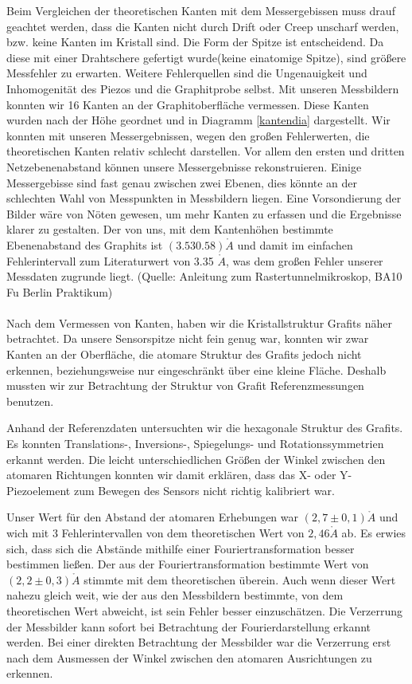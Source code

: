 \documentclass[10pt,a4paper]{article}
\begin{document}
Beim Vergleichen der theoretischen Kanten mit dem Messergebissen muss drauf geachtet werden, dass die Kanten nicht durch Drift oder Creep unscharf werden, bzw. keine Kanten im Kristall sind. Die Form der Spitze ist entscheidend. Da diese mit einer Drahtschere gefertigt wurde(keine einatomige Spitze), sind größere Messfehler zu erwarten. Weitere Fehlerquellen sind die Ungenauigkeit und Inhomogenität des Piezos und die Graphitprobe selbst.
Mit unseren Messbildern konnten wir 16 Kanten an der Graphitoberfläche vermessen. Diese Kanten wurden nach der Höhe geordnet und in Diagramm \ref{kantendia} dargestellt. Wir konnten mit unseren Messergebnissen, wegen den großen Fehlerwerten, die theoretischen Kanten relativ schlecht darstellen. Vor allem den ersten und dritten Netzebenenabstand können unsere Messergebnisse rekonstruieren. Einige Messergebisse sind fast genau zwischen zwei Ebenen, dies könnte an der schlechten Wahl von Messpunkten in Messbildern liegen. Eine Vorsondierung der Bilder wäre von Nöten gewesen, um mehr Kanten zu erfassen und die Ergebnisse klarer zu gestalten.
Der von uns, mit dem Kantenhöhen bestimmte Ebenenabstand des Graphits ist $(3.53 0.58)\mathring{A}$ und damit im einfachen Fehlerintervall zum Literaturwert von 3.35 $\mathring{A}$, was dem großen Fehler unserer Messdaten zugrunde liegt. (Quelle: Anleitung zum Rastertunnelmikroskop, BA10 Fu Berlin Praktikum)
\\\\
Nach dem Vermessen von Kanten, haben wir die Kristallstruktur Grafits näher betrachtet. Da unsere Sensorspitze nicht fein genug war, konnten wir zwar Kanten an der Oberfläche, die atomare Struktur des Grafits jedoch nicht erkennen, beziehungsweise nur eingeschränkt über eine kleine Fläche. Deshalb mussten wir zur Betrachtung der Struktur von Grafit Referenzmessungen benutzen.

Anhand der Referenzdaten untersuchten wir die hexagonale Struktur des Grafits. Es konnten Translations-, Inversions-, Spiegelungs- und Rotationssymmetrien erkannt werden. Die leicht unterschiedlichen Größen der Winkel zwischen den atomaren Richtungen konnten wir damit erklären, dass das X- oder Y-Piezoelement zum Bewegen des Sensors nicht richtig kalibriert war.

Unser Wert für den Abstand der atomaren Erhebungen war $(2,7 \pm 0,1) \mathring{A}$ und wich mit 3 Fehlerintervallen von dem theoretischen Wert von $2,46 \mathring{A}$ ab. Es erwies sich, dass sich die Abstände mithilfe einer Fouriertransformation besser bestimmen ließen. Der aus der Fouriertransformation bestimmte Wert von $(2,2 \pm 0,3)\mathring{A}$ stimmte mit dem theoretischen überein. Auch wenn dieser Wert nahezu gleich weit, wie der aus den Messbildern bestimmte, von dem theoretischen Wert abweicht, ist sein Fehler besser einzuschätzen. Die Verzerrung der Messbilder kann sofort bei Betrachtung der Fourierdarstellung erkannt werden. Bei einer direkten Betrachtung der Messbilder war die Verzerrung erst nach dem Ausmessen der Winkel zwischen den atomaren Ausrichtungen zu erkennen.
\end{document}
